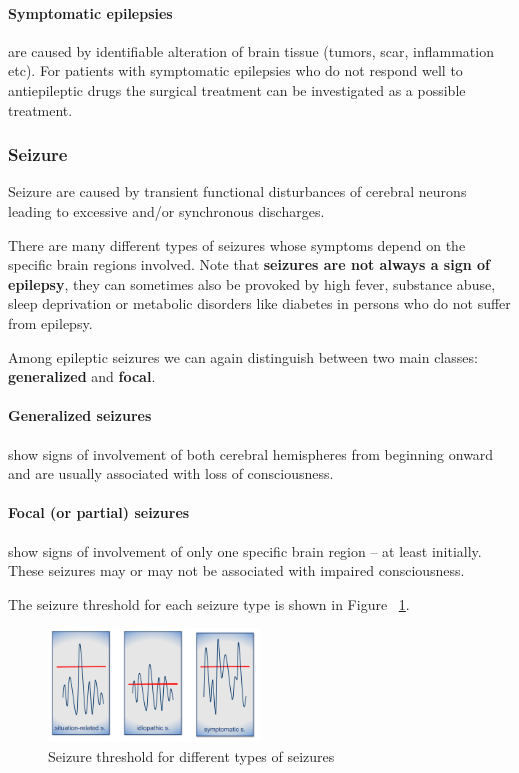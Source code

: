 \documentclass[12pt,article,oneside,a4paper]{memoir}
\begin{document}
\paragraph{Symptomatic epilepsies} are caused by identifiable alteration of brain tissue (tumors, scar, inflammation etc). For patients with symptomatic epilepsies who do not respond well to antiepileptic drugs the surgical treatment can be investigated as a possible treatment.

\subsubsection{Seizure}
Seizure are caused by transient functional disturbances of cerebral neurons leading to excessive and/or synchronous discharges.

There are many different types of seizures whose symptoms depend on the specific brain regions involved. 
Note that \textbf{seizures are not always a sign of epilepsy}, they can sometimes also be provoked by high fever, substance abuse, sleep deprivation or metabolic disorders like diabetes in persons who do not suffer from epilepsy.

Among epileptic seizures we can again distinguish between two main classes: \textbf{generalized} and \textbf{focal}.

\paragraph{Generalized seizures} show signs of involvement of both cerebral hemispheres from beginning onward and are usually associated with loss of consciousness.

\paragraph{Focal (or partial) seizures} show signs of involvement of only one specific brain region – at least initially. These seizures may or may not be associated with impaired consciousness.

The seizure threshold for each seizure type is shown in Figure ~\ref{fig:seizure-threshold}.

\begin{figure}
  \centering
  \includegraphics[width=0.5\textwidth]{imgs/seizure-threshold.png}
  \caption{Seizure threshold for different types of seizures}
  \label{fig:seizure-threshold}
\end{figure}
\end{document}
